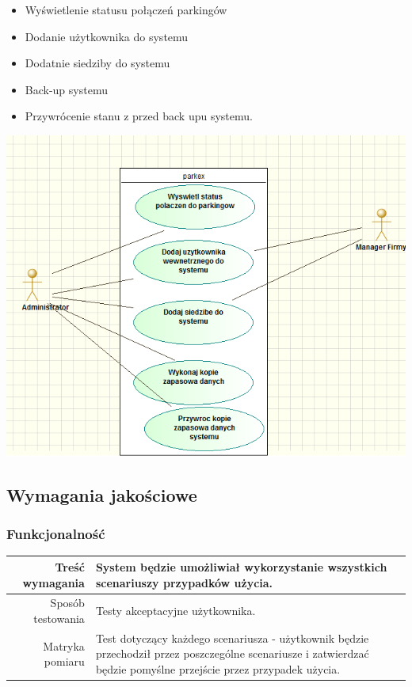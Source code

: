 \documentclass[paper=a4, fontsize=11pt]{scrartcl} %
\begin{document}
\begin{itemize}
\item Wyświetlenie statusu połączeń parkingów
\item Dodanie użytkownika do systemu
\item Dodatnie siedziby do systemu
\item Back-up systemu
\item Przywrócenie stanu z przed back upu systemu.
\end{itemize}

\includegraphics[scale=0.7]{admin}

\subsection{Wymagania jakościowe}

\subsubsection{Funkcjonalność}

\begin{tabularx}{\textwidth}{|r|X|}
  \hline
Treść wymagania  & System będzie umożliwiał wykorzystanie wszystkich scenariuszy przypadków użycia. \\ 
  \hline
Sposób testowania  & Testy akceptacyjne użytkownika. \\ 
  \hline
Matryka pomiaru  & Test dotyczący każdego scenariusza - użytkownik będzie przechodził przez poszczególne scenariusze i zatwierdzać będzie pomyślne przejście przez przypadek użycia. \\ 
  \hline
\end{tabularx}
\end{document}
